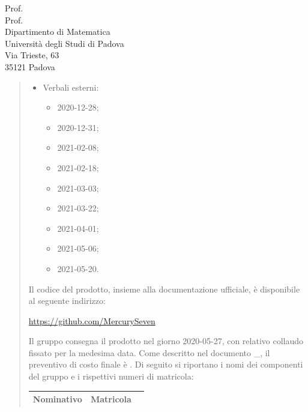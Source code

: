 \documentclass[a4paper,12pt]{letteracdp}
\begin{document}
\begin{letter}{
	Prof. \Tullio{} \\
	Prof. \Riccardo{} \\
	Dipartimento di Matematica \\
	Università degli Studi di Padova \\
	Via Trieste, 63 \\
	35121 Padova}
\begin{quotation}
\begin{itemize}
\begin{itemize}
			\item \docVI{}2021-02-01;
			\item \docVI{}2021-02-20;
			\item \docVI{}2021-03-18;
			\item \docVI{}2021-03-28;
			\item \docVI{}2021-04-16;
			\item \docVI{}2021-05-07;
			\item \docVI{}2021-05-20.
		\end{itemize}
		\item Verbali esterni:
		\begin{itemize}
			\item \docVE{}2020-12-28;
			\item \docVE{}2020-12-31;
			\item \docVE{}2021-02-08;
			\item \docVE{}2021-02-18;
			\item \docVE{}2021-03-03;
			\item \docVE{}2021-03-22;
			\item \docVE{}2021-04-01;
			\item \docVE{}2021-05-06;
			\item \docVE{}2021-05-20.
		\end{itemize}
\thispagestyle{empty}		
	\end{itemize}
Il codice del prodotto, insieme alla documentazione ufficiale, è disponibile al seguente indirizzo:\newline{}
\centerline{\url{https://github.com/MercurySeven}}\newline{}
Il gruppo consegna il prodotto nel giorno 2020-05-27, con relativo collaudo fissato per la medesima data.\newline{}
Come descritto nel documento \docPdP{}\_\versPdP{}, il preventivo di costo finale è \textbf{}. \newline{}
Di seguito si riportano i nomi dei componenti del gruppo e i rispettivi numeri di matricola:
	
	
\renewcommand{\arraystretch}{1}
	\begin{table}
		\begin{center}
			\setlength{\aboverulesep}{0pt}
			\setlength{\belowrulesep}{0pt}
			\setlength{\extrarowheight}{.75ex}
			\begin{tabular}{ c c c }
				\rowcolor{AzzurroGruppo!30} 
				\textbf{Nominativo} & \textbf{Matricola}\\
				\toprule
				

\end{tabular}
\end{center}
\end{table}
\end{quotation}
\end{letter}
\end{document}
